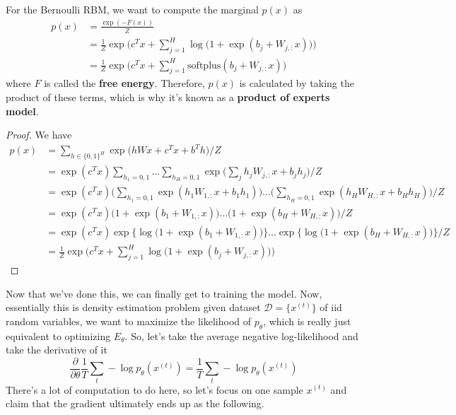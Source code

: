  \begin{lemma} 
    For the Bernoulli RBM, we want to compute the marginal $p(x)$ as
    \begin{align*} 
    p(x) & = \frac{\exp(-F(x))}{Z} \\
                  & = \frac{1}{Z} \exp \bigg( c^T x + \sum_{j=1}^H \log \big( 1 + \exp (b_j + W_{j, :} x) \big) \bigg) \\
                  & = \frac{1}{Z} \exp \bigg( c^T x + \sum_{j=1}^H \mathrm{softplus}(b_j + W_{j, :} x ) \bigg)
    \end{align*}
    where $F$ is called the \textbf{free energy}. Therefore, $p(x)$ is calculated by taking the product of these terms, which is why it's known as a \textbf{product of experts model}. 
  \end{lemma}
  \begin{proof}
  We have 
  \begin{align*} 
    p(x) & = \sum_{h \in \{0, 1\}^H} \exp \big( h W x + c^T x + b^T h\big) /Z \\
                  & = \exp (c^T x) \sum_{h_1 = 0, 1} \ldots \sum_{h_H = 0, 1} \exp \bigg( \sum_j h_j W_{j, :} x + b_j h_j \bigg) / Z \\
                  & = \exp (c^T x) \bigg( \sum_{h_1 = 0, 1} \exp (h_1 W_{1, :} x + b_1 h_1 ) \bigg) \ldots \bigg( \sum_{h_H = 0, 1} \exp (h_H W_{H, :} x + b_H h_H) \bigg) / Z \\
                  & = \exp (c^T x) \big( 1 + \exp (b_1 + W_{1, :} x) \big) \ldots \big( 1 + \exp (b_H + W_{H, :} x)\big) / Z \\
                  & = \exp (c^T x) \exp\big\{ \log \big( 1 + \exp (b_1 + W_{1, :} x) \big) \big\} \ldots \exp \big\{ \log \big( 1 + \exp (b_H + W_{H, :} x) \big) \big\} / Z \\
                  & = \frac{1}{Z} \exp \bigg( c^T x + \sum_{j=1}^H \log \big( 1 + \exp (b_j + W_{j, :} x) \big) \bigg) 
  \end{align*} 
  \end{proof}

  Now that we've done this, we can finally get to training the model. Now, essentially this is density estimation problem given dataset $\mathcal{D} = \{x^{(t)}\}$ of iid random variables, we want to maximize the likelihood of $p_{\theta}$, which is really just equivalent to optimizing $E_{\theta}$. So, let's take the average negative log-likelihood and take the derivative of it
  \begin{equation}
    \frac{\partial}{\partial \theta} \frac{1}{T} \sum_t - \log p_{\theta} (x^{(t)}) = \frac{1}{T} \sum_t - \log{p_{\theta} (x^{(t)})}
  \end{equation}
  There's a lot of computation to do here, so let's focus on one sample $x^{(t)}$ and claim that the gradient ultimately ends up as the following. 

